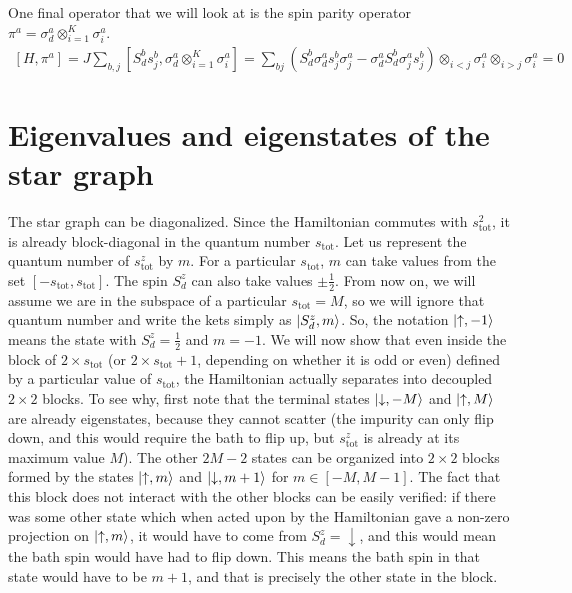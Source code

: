 \documentclass[12pt]{revtex4-2}
\begin{document}
One final operator that we will look at is the spin parity operator \(\pi^a = \sigma_d^a \otimes_{i=1}^K \sigma_i^a\).
\begin{align}
	\left[H, \pi^a\right] = J\sum_{b,j} \left[S_d^b s_j^b, \sigma_d^a \otimes_{i=1}^K \sigma_i^a\right] = \sum_{bj}\left(S_d^b \sigma_d^a s^b_j \sigma^a_j - \sigma_d^a S_d^b \sigma^a_j s^b_j\right) \otimes_{i<j}\sigma_i^a \otimes_{i>j}\sigma^a_i = 0
\end{align}

\section{Eigenvalues and eigenstates of the star graph}
The star graph can be diagonalized. Since the Hamiltonian commutes with \(s_\text{tot}^2\), it is already block-diagonal in the quantum number \(s_\text{tot}\). Let us represent the quantum number of \(s_\text{tot}^z\) by \(m\). For a particular \(s_\text{tot}\), \(m\) can take values from the set \(\left[-s_\text{tot}, s_\text{tot}\right] \). The spin \(S_d^z\) can also take values \(\pm \frac{1}{2}\). From now on, we will assume we are in the subspace of a particular \(s_\text{tot} = M\), so we will ignore that quantum number and write the kets simply as \(\ket{S_d^z, m}\). So, the notation \(\ket{\uparrow,-1}\) means the state with \(S_d^z = \frac{1}{2}\) and \(m = -1\). We will now show that even inside the block of \(2\times s_\text{tot}\) (or \(2\times s_\text{tot} + 1\), depending on whether it is odd or even) defined by a particular value of \(s_\text{tot}\), the Hamiltonian actually separates into decoupled \(2\times 2\) blocks. To see why, first note that the terminal states \(\ket{\downarrow, -M}\) and \(\ket{\uparrow, M}\) are already eigenstates, because they cannot scatter (the impurity can only flip down, and this would require the bath to flip up, but \(s^z_\text{tot}\) is already at its maximum value \(M\)). The other \(2M - 2\) states can be organized into \(2\times 2\) blocks formed by the states \(\ket{\uparrow, m}\) and \(\ket{\downarrow, m+1}\) for \(m \in \left[-M, M-1\right] \). The fact that this block does not interact with the other blocks can be easily verified: if there was some other state which when acted upon by the Hamiltonian gave a non-zero projection on \(\ket{\uparrow, m}\), it would have to come from \(S_d^z = \downarrow\), and this would mean the bath spin would have had to flip down. This means the bath spin in that state would have to be \(m+1\), and that is precisely the other state in the block. 
\end{document}

